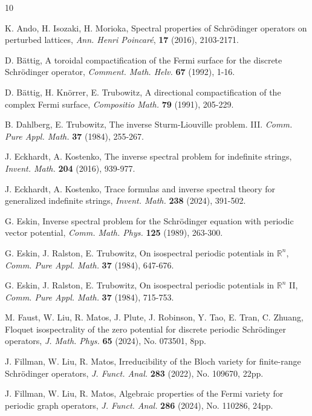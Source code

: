 \documentclass[12pt,letterpaper]{amsart}
\begin{document}

\begin{thebibliography}{10}


 K. Ando, H. Isozaki, H. Morioka,
Spectral properties of Schr\"{o}dinger operators on perturbed lattices,
\emph{Ann. Henri Poincar\'{e}}, \textbf{17} (2016), 2103-2171.

 D. B\"{a}ttig,
A toroidal compactification of the Fermi surface for the discrete Schr\"{o}dinger operator,
\emph{Comment. Math. Helv.} \textbf{67} (1992), 1-16.

 D. B\"{a}ttig, H. Kn\"{o}rrer, E. Trubowitz,
A directional compactification of the complex Fermi surface,
\emph{Compositio Math.} \textbf{79} (1991), 205-229.

 B. Dahlberg, E. Trubowitz, The inverse Sturm-Liouville problem. III.
\emph{Comm. Pure Appl. Math.} \textbf{37} (1984), 255-267.

J. Eckhardt, A. Kostenko, The inverse spectral problem for indefinite strings,
\emph{Invent. Math.} \textbf{204} (2016), 939-977.

 J. Eckhardt, A. Kostenko, Trace formulas and inverse spectral theory for generalized
indefinite strings, \emph{Invent. Math.} \textbf{238} (2024), 391-502.


 G. Eskin, Inverse spectral problem for the Schr\"{o}dinger equation with periodic vector potential,
\emph{Comm. Math. Phys.} \textbf{125} (1989), 263-300.

 G. Eskin, J. Ralston, E. Trubowitz,
On isospectral periodic potentials in \({\mathbb R}^n\),
\emph{Comm. Pure Appl. Math.} \textbf{37} (1984), 647-676.

 G. Eskin, J. Ralston, E. Trubowitz,
On isospectral periodic potentials in \({\mathbb R}^n\) II,
\emph{Comm. Pure Appl. Math.} \textbf{37} (1984), 715-753.


 M. Faust, W. Liu, R. Matos, J. Plute, J. Robinson, Y. Tao, E. Tran, C. Zhuang,
Floquet isospectrality of the zero potential for discrete periodic Schr\"{o}dinger operators,
\emph{J. Math. Phys.}  \textbf{65} (2024), No. 073501, 8pp.

 J. Fillman, W. Liu, R. Matos,
Irreducibility of the Bloch variety for finite-range Schr\"{o}dinger operators,
\emph{J. Funct. Anal.} \textbf{283} (2022), No. 109670, 22pp.

 J. Fillman, W. Liu, R. Matos,
Algebraic properties of the Fermi variety for periodic graph operators,
\emph{J. Funct. Anal.} \textbf{286} (2024), No. 110286, 24pp.


\end{thebibliography}
\end{document}
